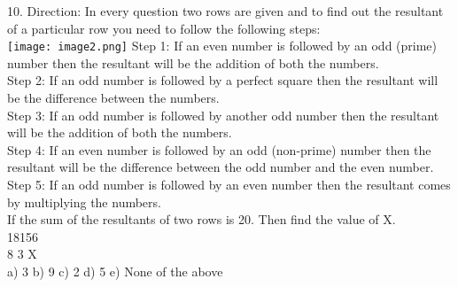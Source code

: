 \documentclass[
]{article}
\begin{document}
10. Direction: In every question two rows are given and to find out the resultant of a particular row you need to follow the following steps:\\
\texttt{[image: image2.png]}
Step 1: If an even number is followed by an odd (prime) number then the resultant will be the addition of both the numbers.\\
Step 2: If an odd number is followed by a perfect square then the resultant will be the difference between the numbers.\\
Step 3: If an odd number is followed by another odd number then the resultant will be the addition of both the numbers.\\
Step 4: If an even number is followed by an odd (non-prime) number then the resultant will be the difference between the odd number and the even number.\\
Step 5: If an odd number is followed by an even number then the resultant comes by multiplying the numbers.\\
If the sum of the resultants of two rows is 20. Then find the value of X.\\

18\hspace{5mm}15\hspace{5mm}6\\
8 \hspace{5mm}3 \hspace{5mm}X\\
a) 3 \hspace{2mm}b) 9 \hspace{2mm}c) 2 \hspace{2mm}d) 5 \hspace{2mm}e) None of the above\\
\end{document}
